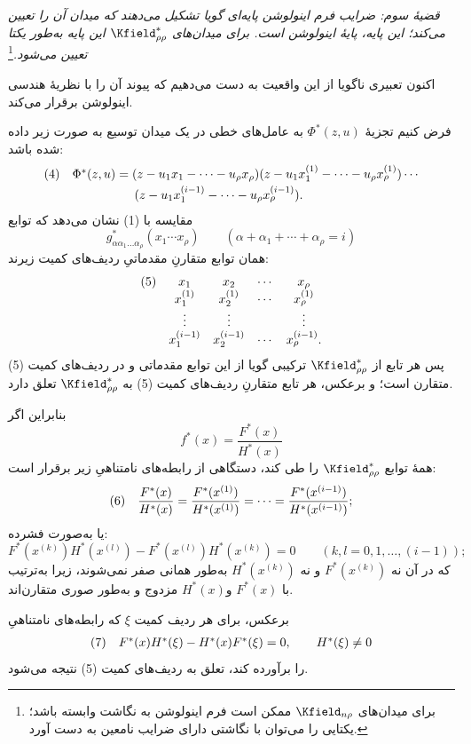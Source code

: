 \documentclass[11pt]{article}
\newcommand{\srcLTR}[1]{\relax\ifmmode\text{\mbox{\babelsublr{\foreignlanguage{english}{#1}}}}\else\babelsublr{\foreignlanguage{english}{#1}}\fi}
\newcommand{\srcfn}[2]{\begingroup\renewcommand{\thefootnote}{\srcLTR{#1}}\footnote{#2}\addtocounter{footnote}{-1}\endgroup}
\begin{document}
\emph{قضیهٔ سوم: ضرایب فرم اینولوشن پایه‌ای گویا تشکیل می‌دهند که میدان آن را تعیین می‌کند؛ این پایه، پایهٔ اینولوشن است. برای میدان‌های $\Kfield^*_{\rho\rho}$ این پایه به‌طور یکتا تعیین می‌شود.}\srcfn{*)}{برای میدان‌های $\Kfield_{n\rho}$ ممکن است فرم اینولوشن به نگاشت وابسته باشد؛ یکتایی را می‌توان با نگاشتی دارای ضرایب نامعین به دست آورد.}

اکنون تعبیری ناگویا از این واقعیت به دست می‌دهیم که پیوند آن را با نظریهٔ هندسی اینولوشن برقرار می‌کند.

فرض کنیم تجزیهٔ $\Phi^*(z,u)$ به عامل‌های خطی در یک میدان توسیع به صورت زیر داده شده باشد:
\[
\begin{array}{@{}l@{\quad}l@{}}
(4)& \Phi^*(z,u)=(z-u_1x_1-\cdots-u_\rho x_\rho)(z-u_1x_1^{(1)}-\cdots-u_\rho x_\rho^{(1)})\cdots\\[0.25em]
& \qquad\qquad\quad (z-u_1x_1^{(i-1)}-\cdots-u_\rho x_\rho^{(i-1)}).
\end{array}
\]
مقایسه با (1) نشان می‌دهد که توابع
\[
g^*_{\alpha\alpha_1\ldots\alpha_\rho}(x_1\cdots x_\rho)\qquad(\alpha+\alpha_1+\cdots+\alpha_\rho=i)
\]
همان توابع متقارنِ مقدماتیِ ردیف‌های کمیت زیرند:
\[
\begin{array}{@{}l@{\quad}cccc@{}}
(5)&x_1&x_2&\cdots&x_\rho\\
&x_1^{(1)}&x_2^{(1)}&\cdots&x_\rho^{(1)}\\
&\vdots&\vdots&&\vdots\\
&x_1^{(i-1)}&x_2^{(i-1)}&\cdots&x_\rho^{(i-1)}.
\end{array}
\]
پس هر تابع از $\Kfield^*_{\rho\rho}$ ترکیبی گویا از این توابع مقدماتی و در ردیف‌های کمیت (5) متقارن است؛ و برعکس، هر تابع متقارنِ ردیف‌های کمیت (5) به $\Kfield^*_{\rho\rho}$ تعلق دارد.

بنابراین اگر
\[
f^*(x)=\frac{F^*(x)}{H^*(x)}
\]
همهٔ توابع $\Kfield^*_{\rho\rho}$ را طی کند، دستگاهی از رابطه‌های نامتناهیِ زیر برقرار است:
\[
\begin{array}{@{}l@{\quad}c@{}}
(6)&\displaystyle \frac{F^*(x)}{H^*(x)}=\frac{F^*(x^{(1)})}{H^*(x^{(1)})}=\cdots=\frac{F^*(x^{(i-1)})}{H^*(x^{(i-1)})};
\end{array}
\]
یا به‌صورت فشرده:
\[
F^*(x^{(k)})H^*(x^{(l)})-F^*(x^{(l)})H^*(x^{(k)})=0\qquad(k,l=0,1,\ldots,(i-1));
\]
که در آن نه $F^*(x^{(k)})$ و نه $H^*(x^{(k)})$ به‌طور همانی صفر نمی‌شوند، زیرا به‌ترتیب با $F^*(x)$ و$H^*(x)$ مزدوج و به‌طور صوری متقارن‌اند.

برعکس، برای هر ردیف کمیت $\xi$ که رابطه‌های نامتناهیِ
\[
\begin{array}{@{}l@{\quad}c@{}}
(7)&F^*(x)H^*(\xi)-H^*(x)F^*(\xi)=0,\qquad H^*(\xi)\ne0
\end{array}
\]
را برآورده کند، تعلق به ردیف‌های کمیت (5) نتیجه می‌شود.
\end{document}
